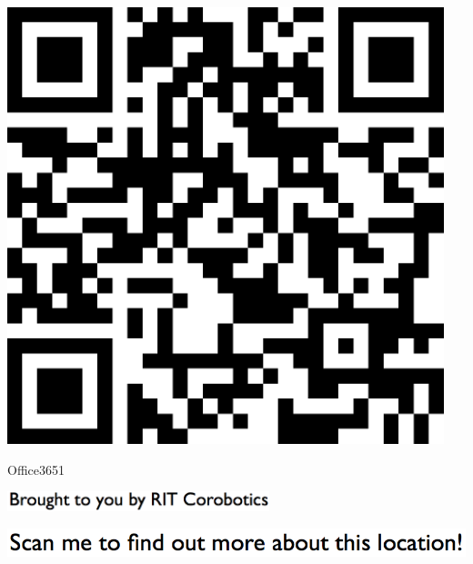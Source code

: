 \documentclass[letterpaper]{article}
\begin{document}
 \begingroup 
 \centerline{\includegraphics[scale=1,width=5in,height=5in]{Office3651.png}} 
 \endgroup 
 \vspace*{\fill} 

 \hfill{\small Office3651} 

  \vspace{0.7in} 
 
 \centerline{\includegraphics[scale=1,width=3in]{text-bottom.png}} 
 
 \pagebreak 
{} 
 \vspace*{\fill} 
 
  \centerline{\includegraphics[scale=1,width=6in]{text-top.png}} 
 
 \vspace{0.5in} 
 
\end{document}
